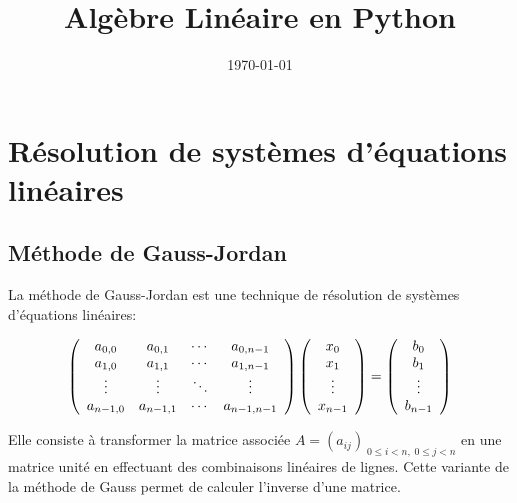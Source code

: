 \documentclass[a4paper, 10pt]{article}
\begin{document}
\title{Algèbre Linéaire en Python}

\date{\today}
 
\maketitle


\section{Résolution de systèmes d'équations linéaires}

\subsection{Méthode de Gauss-Jordan}

La méthode de Gauss-Jordan est une technique de résolution de systèmes d'équations linéaires:

\begin{equation}
\left(
\begin{array}{c c c c}
a_{0,0}   & a_{0,1}   & \cdots & a_{0,n-1} \\
a_{1,0}   & a_{1,1}   & \cdots & a_{1,n-1} \\
\vdots         & \vdots         & \ddots & \vdots \\
a_{n-1,0} & a_{n-1,1} & \cdots & a_{n-1,n-1} 
\end{array}
\right)
\left(
\begin{array}{c}
x_0 \\ x_1 \\ \vdots \\ x_{n-1}
\end{array}
\right)
=
\left(
\begin{array}{c}
b_0 \\ b_1 \\ \vdots \\ b_{n-1}
\end{array}
\right)
\end{equation}


Elle consiste à transformer la matrice associée $A=(a_{ij})_{\; 0\leq i < n,\;  0\leq j < n }$ en une matrice unité en effectuant des combinaisons linéaires de lignes.
Cette variante de la méthode de Gauss permet de calculer l'inverse d'une matrice.
\end{document}
